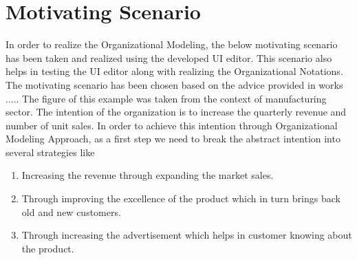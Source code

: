\chapter{Motivating Scenario}
\label{chap:motivatingScenario}

In order to realize the Organizational Modeling, the below motivating scenario has been taken and realized using the developed UI editor.
This scenario also helps in testing the UI editor along with realizing the Organizational Notations. The motivating scenario has been chosen based on the advice provided in works ..... The figure of this example was taken from the context of manufacturing sector. The  intention of the organization is to increase the quarterly revenue and number of unit sales. In order to achieve this intention through Organizational Modeling Approach, as a first step we need to break the abstract intention into several strategies like
\begin{enumerate}
	\item Increasing the revenue through expanding the market sales. 
	\item Through improving the excellence of the product which in turn brings back old and new customers.
	\item Through increasing the advertisement which helps in customer knowing about the product.
\end{enumerate}

